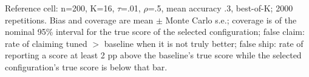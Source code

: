 Reference cell: n=200, K=16, $\tau$=.01, $\rho$=.5, mean accuracy .3, best-of-K; 2000 repetitions. Bias and coverage are mean $\pm$ Monte Carlo s.e.; coverage is of the nominal 95\% interval for the true score of the selected configuration; false claim: rate of claiming tuned $>$ baseline when it is not truly better; false ship: rate of reporting a score at least 2 pp above the baseline's true score while the selected configuration's true score is below that bar.
